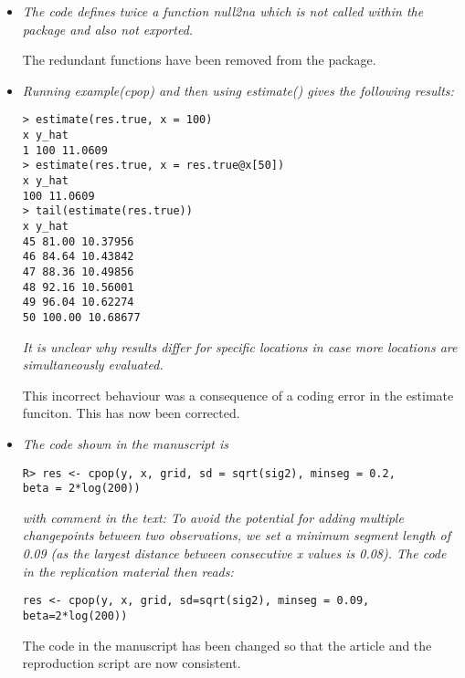 \documentclass[12pt]{article}
\begin{document}
\begin{itemize}
\item {\em The code defines twice a function null2na which is not called within the package and also not exported.}

The redundant functions have been removed from the package.

\item {\em Running example(cpop) and then using estimate() gives the following results:}
\begin{verbatim}
> estimate(res.true, x = 100)
x y_hat
1 100 11.0609
> estimate(res.true, x = res.true@x[50])
x y_hat
100 11.0609
> tail(estimate(res.true))
x y_hat
45 81.00 10.37956
46 84.64 10.43842
47 88.36 10.49856
48 92.16 10.56001
49 96.04 10.62274
50 100.00 10.68677
\end{verbatim}
{\em It is unclear why results differ for specific locations in case more locations are simultaneously evaluated.}

This incorrect behaviour was a consequence of a coding error in the estimate funciton. This has now been corrected.

\item {\em The code shown in the manuscript is}
\begin{verbatim}
R> res <- cpop(y, x, grid, sd = sqrt(sig2), minseg = 0.2, 
beta = 2*log(200))    
\end{verbatim}
{\em with comment in the text:
To avoid the potential for adding multiple changepoints between two observations, we set a minimum segment length of 0.09 (as the largest distance between consecutive x values is 0.08).
The code in the replication material then reads:}
\begin{verbatim}
res <- cpop(y, x, grid, sd=sqrt(sig2), minseg = 0.09,
beta=2*log(200))
\end{verbatim}

The code in the manuscript has been changed 
so that the article and the reproduction script are now consistent.

\end{itemize}
\end{document}
